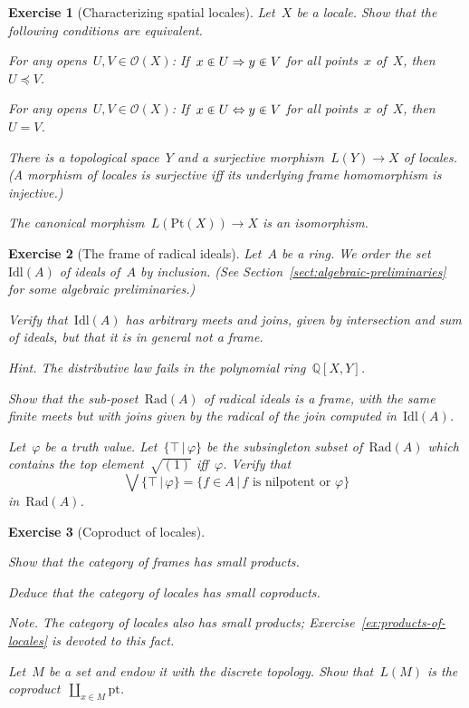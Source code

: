 \documentclass{ws-rv9x6}
\newtheorem{ex}{Exercise}
\newenvironment{exercise}[1]{
  \begin{ex}[#1]
}{\end{ex}}
\renewcommand{\O}{\mathcal{O}}
\newcommand{\QQ}{\mathbb{Q}}
\newcommand{\Rad}{\mathrm{Rad}}
\newcommand{\Idl}{\mathrm{Idl}}
\renewcommand{\_}{\mathpunct{.}}
\newcommand{\?}{\,{:}\,}
\newcommand{\pt}{\mathrm{pt}}
\newcommand{\Pt}{\mathrm{Pt}}
\begin{document}
\begin{exercise}{Characterizing spatial locales}%
Let~$X$ be a locale. Show that the following conditions are equivalent.
\begin{alphlist}[(c)]
\item For any opens~$U, V \in \O(X)$: If~$x \inplus U \Rightarrow y \inplus V$
for all points~$x$ of~$X$, then~$U \preceq V$.
\item For any opens~$U, V \in \O(X)$: If~$x \inplus U \Leftrightarrow y \inplus V$
for all points~$x$ of~$X$, then~$U = V$.
\item There is a topological space~$Y$ and a surjective morphism~$L(Y) \to X$
of locales. (A morphism of locales is \emph{surjective} iff its underlying
frame homomorphism is injective.)
\item The canonical morphism~$L(\Pt(X)) \to X$ is an isomorphism.
\end{alphlist}
\end{exercise}

\begin{exercise}{The frame of radical ideals}%
\label{ex:frame-of-radical-ideals}%
Let~$A$ be a ring. We order the set~$\Idl(A)$ of ideals of~$A$ by inclusion.
(See Section~\ref{sect:algebraic-preliminaries} for some algebraic
preliminaries.)
\begin{alphlist}[(b)]
\item Verify that~$\Idl(A)$ has arbitrary meets and joins, given by
intersection and sum of ideals, but that it is in general not a
frame.\smallskip

{\scriptsize\emph{Hint.} The distributive law fails in the polynomial ring~$\QQ[X,Y]$.\par}
\item Show that the sub-poset~$\Rad(A)$ of radical ideals is a frame, with
the same finite meets but with joins given by the radical of the join computed
in~$\Idl(A)$.
\item\label{item:join-top} Let~$\varphi$ be a truth value. Let~$\{\top\,|\,\varphi\}$ be the
subsingleton subset of~$\Rad(A)$ which contains the top element~$\sqrt{(1)}$
iff~$\varphi$. Verify that
\[ \bigvee\{\top\,|\,\varphi\} = \{ f \in A \,|\, \text{$f$ is nilpotent
or~$\varphi$} \} \]
in~$\Rad(A)$.
\end{alphlist}
\end{exercise}

\begin{exercise}{Coproduct of locales}%
\begin{alphlist}[(c)]
\item Show that the category of frames has small products.
\item Deduce that the category of locales has small coproducts.\smallskip

{\scriptsize\emph{Note.} The category of locales also has small products;
Exercise~\ref{ex:products-of-locales} is devoted to this fact.\par}
\item Let~$M$ be a set and endow it with the discrete topology. Show
that~$L(M)$ is the coproduct~$\coprod_{x \in M} \pt$.
\end{alphlist}
\end{exercise}
\end{document}
